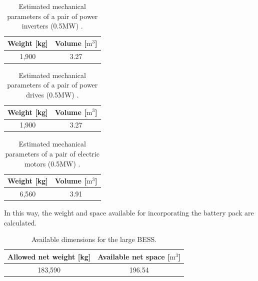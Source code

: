 \begin{table}[H]
	\centering
	\caption{Estimated mechanical parameters of a pair of power inverters (0.5MW) \cite{ABBDrives}.}
	\label{tab:VW_power_inverters}
	\begin{tabular}{|c|c|}
		\hline
		\rule{0pt}{8pt} \textbf{Weight [kg]} & \textbf{Volume [${\text{m}}^{3}$]} \\
		\hline
		\rule{0pt}{8pt} 1,900 & 3.27 \\
		\hline
	\end{tabular}
\end{table}

\begin{table}[H]
	\centering
	\caption{Estimated mechanical parameters of a pair of power drives (0.5MW) \cite{ABBDrives}.}
	\label{tab:VW_power_drives}
	\begin{tabular}{|c|c|}
		\hline
		\rule{0pt}{8pt} \textbf{Weight [kg]} & \textbf{Volume [${\text{m}}^{3}$]} \\
		\hline
		\rule{0pt}{8pt} 1,900 & 3.27 \\
		\hline
	\end{tabular}
\end{table}

\begin{table}[H]
	\centering
	\caption{Estimated mechanical parameters of a pair of electric motors (0.5MW) \cite{W50}.}
	\label{tab:VW_electric_motors}
	\begin{tabular}{|c|c|}
		\hline
		\rule{0pt}{8pt} \textbf{Weight [kg]} & \textbf{Volume [${\text{m}}^{3}$]} \\
		\hline
		\rule{0pt}{8pt} 6,560 & 3.91 \\
		\hline
	\end{tabular}
\end{table}

In this way, the weight and space available for incorporating the battery pack are calculated.

\begin{table}[H]
	\centering
	\caption{Available dimensions for the large BESS.}
	\label{tab:VW_BankBatt_II}
	\begin{tabular}{|c|c|}
		\hline
		\rule{0pt}{8pt} \textbf{Allowed net weight [kg]} & \textbf{Available net space [${\text{m}}^{3}$]} \\
		\hline
		\rule{0pt}{8pt} 183,590 & 196.54  \\
		\hline
	\end{tabular}
\end{table}

